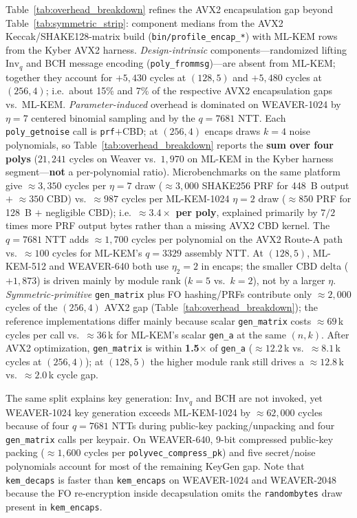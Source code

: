 Table~\ref{tab:overhead_breakdown} refines the AVX2 encapsulation gap beyond
Table~\ref{tab:symmetric_strip}: component medians from the AVX2
Keccak/SHAKE128-matrix build (\texttt{bin/profile\_encap\_*}) with ML-KEM rows
from the Kyber AVX2 harness.
%
\emph{Design-intrinsic} components---randomized lifting $\mathrm{Inv}_q$ and BCH
message encoding (\texttt{poly\_frommsg})---are absent from ML-KEM; together
they account for $+5{,}430$ cycles at $(128,5)$ and $+5{,}480$ cycles at
$(256,4)$;
i.e.\ about 15\% and 7\% of the respective AVX2 encapsulation gaps vs.\ ML-KEM.
%
\emph{Parameter-induced} overhead is dominated on \textsc{WEAVER-1024} by
$\eta{=}7$ centered binomial sampling and by the $q{=}7681$ NTT.
Each \texttt{poly\_getnoise} call is \texttt{prf}$+$CBD; at $(256,4)$ encaps
draws $k{=}4$ noise polynomials, so Table~\ref{tab:overhead_breakdown} reports
the \textbf{sum over four polys} ($21{,}241$ cycles on Weaver vs.\ $1{,}970$ on
ML-KEM in the Kyber harness segment---\textbf{not} a per-polynomial ratio).
Microbenchmarks on the same platform give $\approx{}3{,}350$ cycles per
$\eta{=}7$ draw ($\approx{}3{,}000$ SHAKE256 PRF for 448~B output $+$
$\approx{}350$ CBD) vs.\ $\approx{}987$ cycles per ML-KEM-1024 $\eta{=}2$ draw
($\approx{}850$ PRF for 128~B $+$ negligible CBD); i.e.\ \textbf{$\approx{}3.4\times$
per poly}, explained primarily by $7/2$ times more PRF output bytes rather than
a missing AVX2 CBD kernel.
The $q{=}7681$ NTT adds $\approx{}1{,}700$ cycles per polynomial on the AVX2
Route-A path vs.\ $\approx{}100$ cycles for ML-KEM's $q{=}3329$ assembly NTT.
At $(128,5)$, ML-KEM-512 and \textsc{WEAVER-640} both use $\eta_2{=}2$ in
encaps; the smaller CBD delta ($+1{,}873$) is driven mainly by module rank
($k{=}5$ vs.\ $k{=}2$), not by a larger $\eta$.
%
\emph{Symmetric-primitive} \texttt{gen\_matrix} plus FO hashing/PRFs contribute
only $\approx{}2{,}000$ cycles of the $(256,4)$ AVX2 gap
(Table~\ref{tab:overhead_breakdown}); the reference implementations differ mainly
because scalar \texttt{gen\_matrix} costs $\approx{}69$\,k cycles per call
vs.\ $\approx{}36$\,k for ML-KEM's scalar \texttt{gen\_a} at the same $(n,k)$.
After AVX2 optimization, \texttt{gen\_matrix} is within \textbf{1.5$\times$} of
\texttt{gen\_a} ($\approx{}12.2$\,k vs.\ $\approx{}8.1$\,k cycles at $(256,4)$);
at $(128,5)$ the higher module rank still drives a $\approx{}12.8$\,k vs.\
$\approx{}2.0$\,k cycle gap.

The same split explains key generation: $\mathrm{Inv}_q$ and BCH are not
invoked, yet \textsc{WEAVER-1024} key generation exceeds ML-KEM-1024 by
$\approx{}62{,}000$ cycles because of four $q{=}7681$ NTTs during public-key
packing/unpacking and four \texttt{gen\_matrix} calls per keypair.
On \textsc{WEAVER-640}, 9-bit compressed public-key packing
($\approx{}1{,}600$ cycles per \texttt{polyvec\_compress\_pk}) and five
secret/noise polynomials account for most of the remaining KeyGen gap.
Note that \texttt{kem\_decaps} is faster than \texttt{kem\_encaps} on
\textsc{WEAVER-1024} and \textsc{WEAVER-2048} because the FO re-encryption
inside decapsulation omits the \texttt{randombytes} draw present in
\texttt{kem\_encaps}.

